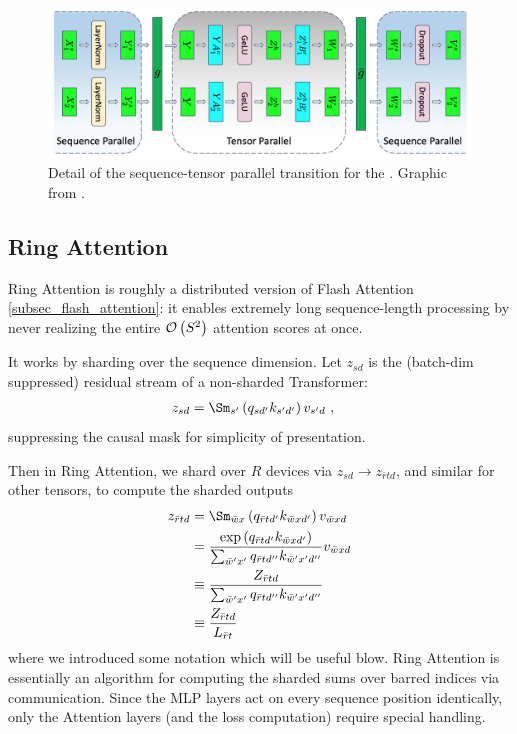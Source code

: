 \begin{figure}[ht]
	\centering
	\includegraphics[scale=.25]{figures/mlp-tensor-sequence-parallel.jpg}
	\caption{Detail of the sequence-tensor parallel transition for the  . Graphic from
		\cite{shoeybi2020megatronlm}. }
	\label{fig_tensor_seq_parallel_detail}
\end{figure}


\subsection{Ring Attention \label{subsec_ring_attention}}

Ring Attention \cite{liu2023ringattentionblockwisetransformers} is roughly a distributed version of
Flash Attention \ref{subsec_flash_attention}: it enables extremely long sequence-length processing
by never realizing the entire $ \mathcal{O} \left( S ^{ 2 } \right)  $ attention scores at once.

It works by sharding over the sequence dimension. Let $ z _{ sd } $ is the (batch-dim suppressed)
residual stream of a non-sharded Transformer:
\begin{align}
    z _{  sd } &= \Sm _{ s' } \left ( q _{ sd' } k _{ s'd' } \right ) v _{ s'd } \ ,
\end{align}
suppressing the causal mask for simplicity of presentation.

Then in Ring Attention, we shard over $ R $ devices via $ z _{ sd } \longrightarrow z _{ \bar{r}td }
$, and similar for other tensors, to compute the sharded outputs
\begin{align}
    z _{  \bar{r}td } &= \Sm _{ \bar{w} x  } \left ( q _{ \bar{r}t d' } k _{ \bar{w}x d' } \right ) v _{ \bar{w}x d }\nn
     &= \frac{ \exp \left ( q _{ \bar{r}t d' } k _{ \bar{w}x d' } \right ) }{ \sum _{ \bar{w}'x' } q _{ \bar{r}t d'' } k _{ \bar{w}'x' d'' }  } v _{ \bar{w}xd }\nn
     &\equiv \frac{ Z _{\bar{r}td } }{   \sum _{ \bar{w}'x' } q _{ \bar{r}t d'' } k _{ \bar{w}'x' d'' }  }\nn
     &\equiv \frac{ Z _{\bar{r}td } }{L _{ \bar{r}t }}
\end{align}
where we introduced some notation which will be useful blow. Ring Attention is essentially an
algorithm for computing the sharded sums over barred indices via communication. Since the MLP layers
act on every sequence position identically, only the Attention layers (and the loss computation)
require special handling.

